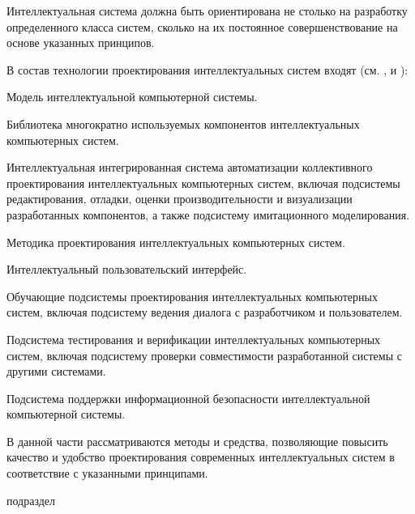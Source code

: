 \begin{partbacktext}
Интеллектуальная система должна быть ориентирована не столько на разработку определенного класса систем, сколько на их постоянное совершенствование на основе указанных принципов.

В состав технологии проектирования интеллектуальных систем входят (см. ,  и ):
\begin{textitemize}
	\item Модель интеллектуальной компьютерной системы.
	\item Библиотека многократно используемых компонентов интеллектуальных компьютерных систем.
	\item Интеллектуальная интегрированная система автоматизации коллективного проектирования интеллектуальных компьютерных систем, включая подсистемы редактирования, отладки, оценки производительности и визуализации разработанных компонентов, а также подсистему имитационного моделирования.
	\item Методика проектирования интеллектуальных компьютерных систем.
	\item Интеллектуальный пользовательский интерфейс.
	\item Обучающие подсистемы проектирования интеллектуальных компьютерных систем, включая подсистему ведения диалога с разработчиком и пользователем.
	\item Подсистема тестирования и верификации интеллектуальных компьютерных систем, включая подсистему проверки совместимости разработанной системы с другими системами.
	\item Подсистема поддержки информационной безопасности интеллектуальной компьютерной системы.
\end{textitemize}

В данной части рассматриваются методы и средства, позволяющие повысить качество и удобство проектирования современных интеллектуальных систем в соответствие с указанными принципами.

\begin{SCn}
\begin{scnrelfromlist}{подраздел}
\end{scnrelfromlist}
\end{SCn}

\end{partbacktext}




